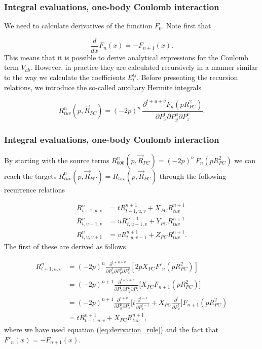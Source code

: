 \documentclass{beamer}
\begin{document}
\begin{frame}
\frametitle{Integral evaluations, one-body Coulomb interaction}

\begin{block}{}

We need to calculate derivatives of the function $F_0$. Note first that

\begin{equation}
 \frac{d}{dx}F_n(x) = -F_{n+1}(x).
\end{equation}
This means that it is possible to derive analytical expressions for the Coulomb term $V_{ab}$. However, in practice they are calculated recursively in a manner similar to the way we calculate
the coefficients $E^{ij}_t$. Before presenting the recursion relations, we introduce the so-called auxiliary Hermite integrals

\begin{equation}
 R^n_{tuv}(p,\vec R_{PC}) = (-2p)^n\,\frac{\partial^{t+u+v} F_n(p R^2_{PC})}{\partial P_x^t \partial P_y^u \partial P_z^v}.
\end{equation}
\end{block}
\end{frame}

\begin{frame}
\frametitle{Integral evaluations, one-body Coulomb interaction}

\begin{block}{}

By starting with the source terms $R^n_{000}(p,\vec R_{PC}) = (-2p)^n\,F_n(p R^2_{PC})$ we can reach the targets $R^0_{tuv}(p,\vec R_{PC}) = R_{tuv}(p,\vec R_{PC})$ through the following
recurrence relations

\begin{equation}
\label{eq:R_recurrence}
 \begin{split}
  R^n_{t+1,u,v} & = tR^{n+1}_{t-1,u,v} + X_{PC} R^{n+1}_{tuv} \\
  R^n_{t,u+1,v} & = uR^{n+1}_{t,u-1,v} + Y_{PC} R^{n+1}_{tuv} \\
  R^n_{t,u,v+1} & = vR^{n+1}_{t,u,v-1} + Z_{PC} R^{n+1}_{tuv}.
 \end{split}
\end{equation}
The first of these are derived as follows

\begin{align}
 R^{n}_{t+1,u,v} & = (-2p)^n\frac{\partial^{t+u+v}}{\partial P_x^t \partial P_y^u \partial P_z^v} [2pX_{PC}F'_n(pR_{PC}^2)] \\
                 & = (-2p)^{n+1}\frac{\partial^{t+u+v}}{\partial P_x^t\partial P_y^u \partial P_z^v}\Big[X_{PC}F_{n+1}(pR_{PC}^2)\Big] \\
                 & = (-2p)^{n+1}\frac{\partial^{u+v}}{\partial P_y^u \partial P_z^v}\Big[t\frac{\partial^{t-1}}{\partial P_x^{t-1}} + X_{PC}\frac{\partial^t}{\partial P_x^t}\Big]F_{n+1}(pR_{PC}^2) \\
                 & = tR^{n+1}_{t-1,u,v} + X_{PC}R^{n+1}_{tuv},
\end{align}
where we have used equation (\ref{eq:derivation_rule}) and the fact that $F'_n(x) = -F_{n+1}(x)$.
\end{block}
\end{frame}
\end{document}
